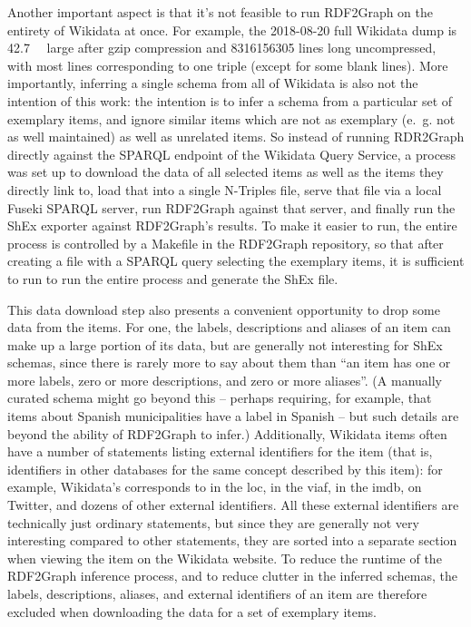 Another important aspect is that it’s not feasible to run RDF2Graph on the entirety of Wikidata at once.
For example, the 2018-08-20 full Wikidata dump is \SI{42.7}{\giga\byte} large after gzip compression %
and \num{8316156305} lines long uncompressed,
with most lines corresponding to one triple (except for some blank lines).
More importantly, inferring a single schema from all of Wikidata is also not the intention of this work:
the intention is to infer a schema from a particular set of exemplary items, %
and ignore similar items which are not as exemplary (e.~g. not as well maintained)
as well as unrelated items. %
So instead of running RDR2Graph directly against the SPARQL endpoint of the Wikidata Query Service,
a process was set up %
to download the data of all selected items as well as the items they directly link to,
load that into a single N-Triples file,
serve that file via a local Fuseki SPARQL server,
run RDF2Graph against that server,
and finally run the ShEx exporter against RDF2Graph’s results.
To make it easier to run, the entire process is controlled by a Makefile in the RDF2Graph repository,
so that after creating a  file with a SPARQL query selecting the exemplary items,
it is sufficient to run  to run the entire process and generate the ShEx file.

This data download step also presents a convenient opportunity to drop some data from the items.
For one, the labels, descriptions and aliases of an item can make up a large portion of its data,
but are generally not interesting for ShEx schemas,
since there is rarely more to say about them than
“an item has one or more labels, zero or more descriptions, and zero or more aliases”. %
(A manually curated schema might go beyond this –
perhaps requiring, for example, that items about Spanish municipalities have a label in Spanish –
but such details are beyond the ability of RDF2Graph to infer.)
Additionally, Wikidata items often have a number of statements listing external identifiers for the item
(that is, identifiers in other databases for the same concept described by this item):
for example, Wikidata’s  corresponds to  in the \gls{loc},
 in the \gls{viaf},
 in the \gls{imdb},
 on Twitter,
and dozens of other external identifiers. %
All these external identifiers are technically just ordinary statements,
but since they are generally not very interesting compared to other statements,
they are sorted into a separate section when viewing the item on the Wikidata website.
To reduce the runtime of the RDF2Graph inference process,
and to reduce clutter in the inferred schemas,
the labels, descriptions, aliases, and external identifiers of an item
are therefore excluded when downloading the data for a set of exemplary items.

